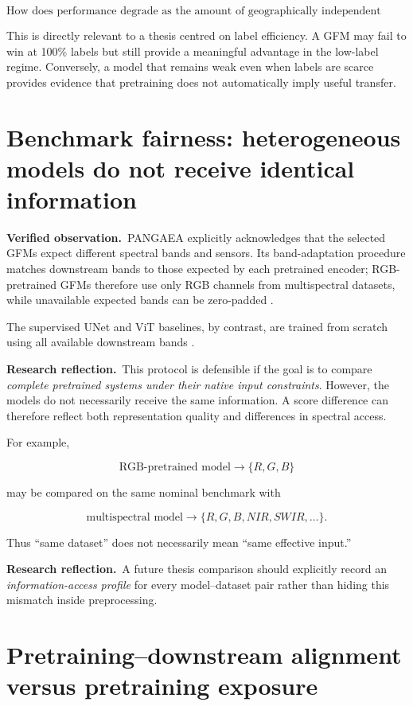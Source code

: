 \documentclass[11pt,a4paper]{article}
\newcommand{\verified}{\textcolor{verifiedgreen}{\textbf{Verified observation.}}}
\newcommand{\reflection}{\textcolor{reflectionorange}{\textbf{Research reflection.}}}
\begin{document}
\[
\boxed{
\text{How does performance degrade as the amount of geographically independent supervision decreases?}
}
\]

This is directly relevant to a thesis centred on label efficiency. A GFM may fail to win at
100\% labels but still provide a meaningful advantage in the low-label regime. Conversely, a
model that remains weak even when labels are scarce provides evidence that pretraining does
not automatically imply useful transfer.

\section{Benchmark fairness: heterogeneous models do not receive identical information}

\verified\ PANGAEA explicitly acknowledges that the selected GFMs expect different spectral
bands and sensors. Its band-adaptation procedure matches downstream bands to those expected
by each pretrained encoder; RGB-pretrained GFMs therefore use only RGB channels from
multispectral datasets, while unavailable expected bands can be zero-padded \cite{pangaea}.

The supervised UNet and ViT baselines, by contrast, are trained from scratch using all
available downstream bands \cite{pangaea}.

\reflection\ This protocol is defensible if the goal is to compare \emph{complete pretrained
systems under their native input constraints}. However, the models do not necessarily receive
the same information. A score difference can therefore reflect both representation quality
and differences in spectral access.

For example,

\[
\text{RGB-pretrained model}
\rightarrow
\{R,G,B\}
\]

may be compared on the same nominal benchmark with

\[
\text{multispectral model}
\rightarrow
\{R,G,B,NIR,SWIR,\ldots\}.
\]

Thus ``same dataset'' does not necessarily mean ``same effective input.''

\reflection\ A future thesis comparison should explicitly record an \emph{information-access
profile} for every model--dataset pair rather than hiding this mismatch inside preprocessing.

\section{Pretraining--downstream alignment versus pretraining exposure}
\end{document}

